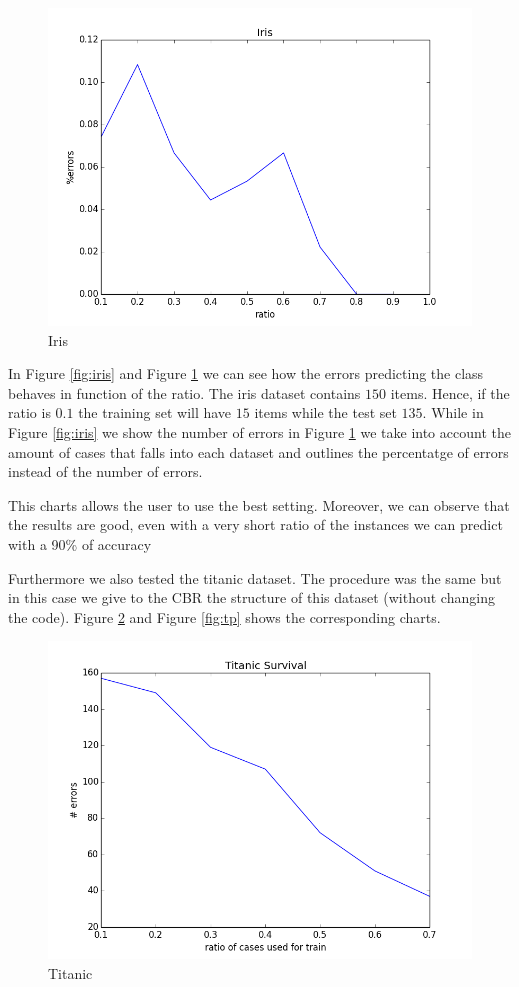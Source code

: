 \documentclass[11pt]{article}
\begin{document}
\begin{figure}[htb]
    \center
    \includegraphics[width=0.7\linewidth]{images/iris_p_bo}
    \caption{Iris}
    \label{fig:irisp}
\end{figure}

In Figure \ref{fig:iris} and Figure \ref{fig:irisp} we can see how the errors predicting the class behaves in function of the ratio. The iris dataset contains $150$ items. Hence, if the ratio is $0.1$ the training set will have $15$ items while the test set $135$. While in Figure \ref{fig:iris} we show the number of errors in Figure \ref{fig:irisp} we take into account the amount of cases that falls into each dataset and outlines the percentatge of errors instead of the number of errors.

This charts allows the user to use the best setting. Moreover, we can observe that the results are good, even with a very short ratio of the instances we can predict with a 90\% of accuracy

Furthermore we also tested the titanic dataset. The procedure was the same but in this case we give to the CBR the structure of this dataset (without changing the code). Figure \ref{fig:t} and Figure \ref{fig:tp} shows the corresponding charts.

\begin{figure}[htb]
    \center
    \includegraphics[width=0.7\linewidth]{images/titanic}
    \caption{Titanic}
    \label{fig:t}
\end{figure}
\end{document}
